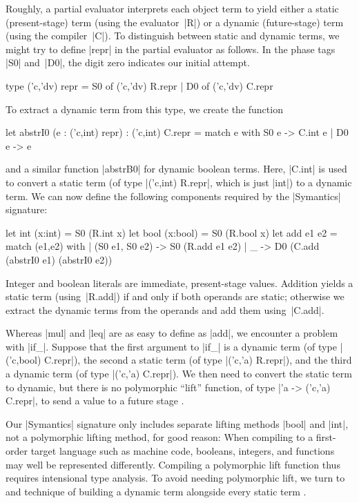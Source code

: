 Roughly, a partial evaluator interprets each object term to yield either
a static (present-stage) term (using the evaluator~|R|) or
a dynamic (future-stage) term (using the compiler~|C|).  To
distinguish between static and dynamic terms, we might try to define
|repr| in the partial evaluator as follows.
In the phase tags |S0| and~|D0|, the digit zero indicates
our initial attempt.
\begin{code}
type ('c,'dv) repr = S0 of ('c,'dv) R.repr | D0 of ('c,'dv) C.repr
\end{code}
To extract a dynamic term from this type, we create the function
\begin{code}
let abstrI0 (e : ('c,int) repr) : ('c,int) C.repr =
  match e with S0 e -> C.int e | D0 e -> e
\end{code}
and a similar function |abstrB0| for dynamic boolean terms. Here, 
|C.int| is used to convert a static term (of type |('c,int) R.repr|, 
which is just |int|) to a dynamic term. We can now define the following
components required by the |Symantics| signature:
\begin{code}
let int  (x:int)  = S0 (R.int x)
let bool (x:bool) = S0 (R.bool x)
let add e1 e2 = match (e1,e2) with
  | (S0 e1, S0 e2) -> S0 (R.add e1 e2)
  | _ -> D0 (C.add (abstrI0 e1) (abstrI0 e2))
\end{code}
Integer and boolean literals are immediate, present-stage
values. Addition yields a static term (using~|R.add|) if and only 
if both operands are static; otherwise we extract the dynamic terms 
from the operands and add them using~|C.add|.

Whereas |mul| and |leq| are as easy to define as |add|, we encounter
a problem with |if_|.  Suppose that the first argument to |if_| 
is a dynamic term
(of type |('c,bool) C.repr|), the second a static term 
(of type |('c,'a) R.repr|), and the third a
dynamic term (of type |('c,'a) C.repr|). We then need to convert
the static term to dynamic, but there is no polymorphic ``lift''
function, of type |'a -> ('c,'a) C.repr|, to send a value to a future stage
\citep{xi-guarded,WalidPOPL03}.
\begin{comment}
(By the way, if we
were to add polymorphic \texttt{lift} to the type class
\texttt{Symantics repr}, then \texttt{repr} would become an instance of
\texttt{Applicative} and thus \texttt{Functor}:\texttt{ fmap
f = app (lift f)~}.)
\end{comment}

Our |Symantics| signature only includes separate lifting methods |bool| and
|int|, not a polymorphic lifting method, for good reason:
When compiling to a first-order target language such as machine code,
booleans, integers, and functions may well be represented differently.
Compiling a polymorphic lift function thus requires intensional type
analysis.  To avoid needing polymorphic lift, we turn to
 and  technique of
building a dynamic term alongside every static term \citep{sumii-hybrid}.

